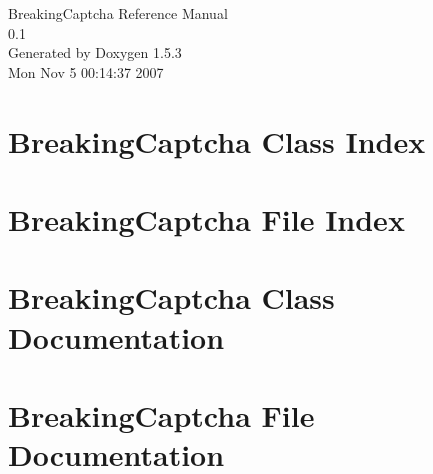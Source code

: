 \documentclass[a4paper]{book}
\begin{document}
\begin{titlepage}
\vspace*{7cm}
\begin{center}
{\Large BreakingCaptcha Reference Manual\\[1ex]\large 0.1 }\\
\vspace*{1cm}
{\large Generated by Doxygen 1.5.3}\\
\vspace*{0.5cm}
{\small Mon Nov 5 00:14:37 2007}\\
\end{center}
\end{titlepage}
\clearemptydoublepage
{}
\tableofcontents
\clearemptydoublepage
{}
\chapter{BreakingCaptcha Class Index}

\chapter{BreakingCaptcha File Index}

\chapter{BreakingCaptcha Class Documentation}



\chapter{BreakingCaptcha File Documentation}






\printindex
\end{document}
